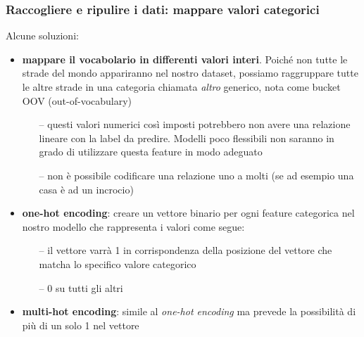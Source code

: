 \begin{frame}

	\frametitle{{\color{GradientDescentDiagramBlue}Raccogliere e ripulire i dati}: mappare valori categorici}

		Alcune soluzioni:
		\begin{itemize}
			\item \textbf{mappare il vocabolario in differenti valori interi}. Poiché non tutte le strade del mondo appariranno nel nostro dataset, possiamo raggruppare tutte le altre strade in una categoria chiamata \textit{altro} generico, nota come bucket OOV (out-of-vocabulary)
				\begin{itemize}
					\item[--] questi valori numerici così imposti potrebbero non avere una relazione lineare con la label da predire. Modelli poco flessibili non saranno in grado di utilizzare questa feature in modo adeguato
					\item[--] non è possibile codificare una relazione uno a molti (se ad esempio una casa è ad un incrocio)
				\end{itemize}
			\item \textbf{one-hot encoding}: creare un vettore binario per ogni feature categorica nel nostro modello che rappresenta i valori come segue:
				\begin{itemize}
					\item[--] il vettore varrà 1 in corrispondenza della posizione del vettore che matcha lo specifico valore categorico
					\item[--] 0 su tutti gli altri
				\end{itemize}
			\item \textbf{multi-hot encoding}: simile al \textit{one-hot encoding} ma prevede la possibilità di più di un solo 1 nel vettore
		\end{itemize}




\end{frame}


